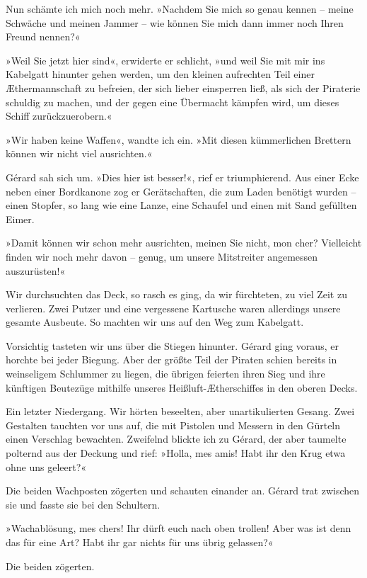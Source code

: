 Nun schämte ich mich noch mehr. »Nachdem Sie mich so genau kennen –
meine Schwäche und meinen Jammer – wie können Sie mich dann immer
noch Ihren Freund nennen?«

»Weil Sie jetzt hier sind«, erwiderte er schlicht, »und weil Sie
mit mir ins Kabelgatt hinunter gehen werden, um den kleinen
aufrechten Teil einer Æthermannschaft zu befreien, der sich lieber
einsperren ließ, als sich der Piraterie schuldig zu machen, und der
gegen eine Übermacht kämpfen wird, um dieses Schiff
zurückzuerobern.«

»Wir haben keine Waffen«, wandte ich ein. »Mit diesen kümmerlichen
Brettern können wir nicht viel ausrichten.«

Gérard sah sich um. »Dies hier ist besser!«, rief er triumphierend.
Aus einer Ecke neben einer Bordkanone zog er Gerätschaften, die zum
Laden benötigt wurden – einen Stopfer, so lang wie eine Lanze, eine
Schaufel und einen mit Sand gefüllten Eimer.

»Damit können wir schon mehr ausrichten, meinen Sie nicht, mon
cher? Vielleicht finden wir noch mehr davon – genug, um unsere
Mitstreiter angemessen auszurüsten!«

Wir durchsuchten das Deck, so rasch es ging, da wir fürchteten, zu
viel Zeit zu verlieren. Zwei Putzer und eine vergessene Kartusche
waren allerdings unsere gesamte Ausbeute. So machten wir uns auf
den Weg zum Kabelgatt.

\bigpar

Vorsichtig tasteten wir uns über die Stiegen hinunter. Gérard ging
voraus, er horchte bei jeder Biegung. Aber der größte Teil der
Piraten schien bereits in weinseligem Schlummer zu liegen, die
übrigen feierten ihren Sieg und ihre künftigen Beutezüge mithilfe
unseres Heißluft-Ætherschiffes in den oberen Decks.

Ein letzter Niedergang. Wir hörten beseelten, aber unartikulierten
Gesang. Zwei Gestalten tauchten vor uns auf, die mit Pistolen und
Messern in den Gürteln einen Verschlag bewachten. Zweifelnd blickte
ich zu Gérard, der aber taumelte polternd aus der Deckung und rief:
»Holla, mes amis! Habt ihr den Krug etwa ohne uns geleert?«

Die beiden Wachposten zögerten und schauten einander an. Gérard
trat zwischen sie und fasste sie bei den Schultern.

»Wachablösung, mes chers! Ihr dürft euch nach oben trollen! Aber
was ist denn das für eine Art? Habt ihr gar nichts für uns übrig
gelassen?«

Die beiden zögerten.

